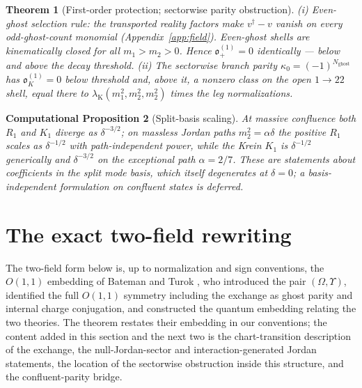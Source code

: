 \documentclass[11pt]{article}
\newtheorem{theorem}{Theorem}[section]
\newtheorem{cproposition}[theorem]{Computational Proposition}
\theoremstyle{definition}
\theoremstyle{remark}
\newcommand{\dg}{\dagger}
\newcommand{\ob}{\mathfrak o}
\begin{document}
\begin{theorem}[First-order protection; sectorwise parity obstruction]
\label{thm:firstfield}
(i) \emph{Even-ghost selection rule}: the transported reality factors
make $v^{\dg}-v$ vanish on every odd-ghost-count monomial
(Appendix~\ref{app:field}).  Even-ghost shells are kinematically closed
for all $m_1>m_2>0$.  Hence $\ob_+^{(1)}=0$ identically --- below and
above the decay threshold.
(ii) The sectorwise branch parity $\kappa_0=(-1)^{N_{\mathrm{ghost}}}$
has $\ob_K^{(1)}=0$ below threshold and, above it, a nonzero class on
the open $1\to22$ shell, equal there to
$\lambda_{\mathrm K}(m_1^2,m_2^2,m_2^2)$ times the leg normalizations.
\end{theorem}

\begin{cproposition}[Split-basis scaling]
At massive confluence both $R_1$ and $K_1$ diverge as $\delta^{-3/2}$;
on massless Jordan paths $m_2^2=\alpha\delta$ the positive $R_1$ scales
as $\delta^{-1/2}$ with path-independent power, while the Krein $K_1$
is $\delta^{-1/2}$ generically and $\delta^{-3/2}$ on the exceptional
path $\alpha=2/7$.  These are statements about coefficients in the
split mode basis, which itself degenerates at $\delta=0$; a
basis-independent formulation on confluent states is deferred.
\end{cproposition}

\section{The exact two-field rewriting}\label{sec:twofield}

The two-field form below is, up to normalization and sign conventions,
the $O(1,1)$ embedding of Bateman and Turok \cite{BT2026}, who
introduced the pair $(\Omega,\Upsilon)$, identified the full $O(1,1)$
symmetry including the exchange as ghost parity and internal charge
conjugation, and constructed the quantum embedding relating the two
theories.  The theorem restates their embedding in our conventions;
the content added in this section and the next two is the
chart-transition description of the exchange, the null-Jordan-sector
and interaction-generated Jordan statements, the location of the
sectorwise obstruction inside this structure, and the confluent-parity
bridge.
\end{document}
